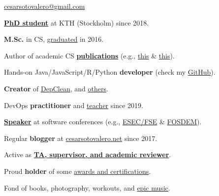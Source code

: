 \documentclass{cesar}
\begin{document}
\ybPrintPhoto{}

{\scshape\bfseries\Large {}}\newline
\href{mailto:cesarsotovalero@gmail.com}{cesarsotovalero@gmail.com}

\vspace{1em}

\textbf{\href{https://www.kth.se/profile/cesarsv}{PhD student}} at KTH (Stockholm) since 2018.

\textbf{M.Sc.} in CS,
  \href{https://www.cesarsotovalero.net/files/certificates/MSc_Degree_(certified)_eng.pdf}{graduated} in 2016.
  
Author of academic CS \textbf{\href{https://www.cesarsotovalero.net/publications}{publications}}
  (e.g., \href{https://dx.doi.org/10.1007/s10664-020-09914-8}{this} \& \href{https://dx.doi.org/10.1109/MSR.2019.00059}{this}).


Hands-on Java/JavaScript/R/Python \textbf{developer}
  (check my \href{https://github.com/cesarsotovalero}{GitHub}).

\textbf{Creator} of \href{https://github.com/castor-software/depclean}{DepClean}, and
  \href{https://www.cesarsotovalero.net/software}{others}.
  
DevOps \textbf{practitioner} and \href{https://github.com/KTH/devops-course}{teacher} since 2019.
  
\textbf{\href{https://www.cesarsotovalero.net/talks}{Speaker}}
  at software conferences (e.g.,
  \href{https://youtu.be/cePEl485E_s}{ESEC/FSE} \&
  \href{https://youtu.be/8SndbPMwdWE}{FOSDEM}).
  
Regular \textbf{blogger} at \href{https://www.cesarsotovalero.net/}{cesarsotovalero.net} since 2017.

Active as \textbf{\href{https://www.cesarsotovalero.net/service}{TA, supervisor, and academic reviewer}}. 

Proud \textbf{holder} of some \href{https://www.cesarsotovalero.net/certifications.html}{awards and certifications}.


Fond of
  books,
  photography,
  workouts,
  and
  \href{https://open.spotify.com/playlist/1E4xBA3IYuTjtTphOV16FM}{epic music}.
\end{document}
